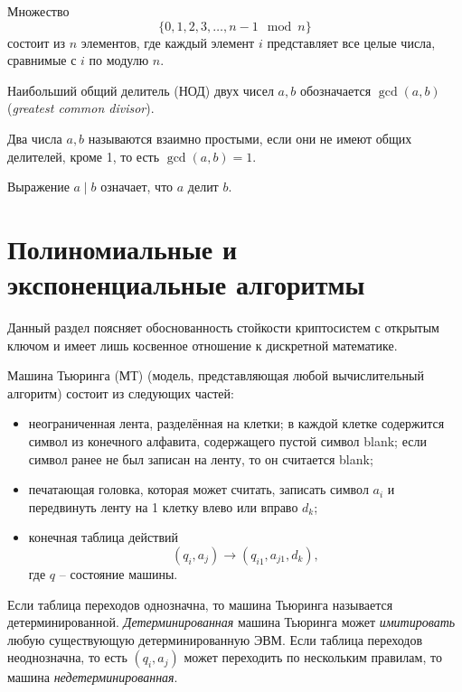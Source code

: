 Множество
    \[ \{ 0, 1, 2, 3, \dots, n-1 \mod n\} \]
состоит из $n$ элементов, где каждый элемент $i$ представляет все целые числа, сравнимые с $i$ по модулю $n$.

Наибольший общий делитель (НОД) двух чисел $a,b$ обозначается $\gcd(a,b)$ (\textit{greatest common divisor}).

Два числа $a,b$ называются взаимно простыми, если они не имеют общих делителей, кроме 1, то есть $\gcd(a,b) = 1$.

Выражение $a \mid b$ означает, что $a$ делит $b$.













\section[Полиномиальные и экспоненциальные алгоритмы]{Полиномиальные и \\ экспоненциальные алгоритмы}

Данный раздел поясняет обоснованность стойкости криптосистем с открытым ключом и имеет лишь косвенное отношение к дискретной математике.

Машина Тьюринга (МТ) (модель, представляющая любой вычислительный алгоритм) состоит из следующих частей:
\begin{itemize}
    \item неограниченная лента, разделённая на клетки; в каждой клетке содержится символ из конечного алфавита, содержащего пустой символ blank; если символ ранее не был записан на ленту, то он считается blank;
    \item печатающая головка, которая может считать, записать символ $a_i$ и передвинуть ленту на 1 клетку влево или вправо $d_k$;
    \item конечная таблица действий
    \[ (q_i, a_j) \rightarrow (q_{i1}, a_{j1}, d_k), \]
где $q$ -- состояние машины.
\end{itemize}

Если таблица переходов однозначна, то машина Тьюринга называется детерминированной. \emph{Детерминированная} машина Тьюринга может \emph{имитировать} любую существующую детерминированную ЭВМ. Если таблица переходов неоднозначна, то есть $(q_i, a_j)$ может переходить по нескольким правилам, то машина \emph{недетерминированная}.

